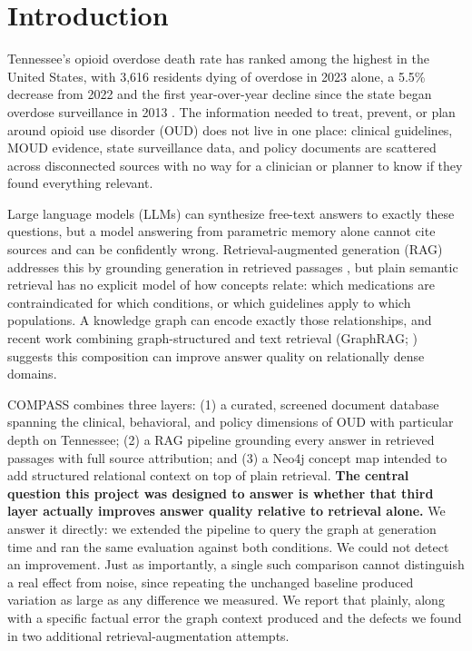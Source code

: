 \documentclass[letterpaper]{article}
\begin{document}
\section{Introduction}

Tennessee's opioid overdose death rate has ranked among the highest in the United States, with 3{,}616 residents dying of overdose in 2023 alone, a 5.5\% decrease from 2022 and the first year-over-year decline since the state began overdose surveillance in 2013 \citep{tdh2025}. The information needed to treat, prevent, or plan around opioid use disorder (OUD) does not live in one place: clinical guidelines, MOUD evidence, state surveillance data, and policy documents are scattered across disconnected sources with no way for a clinician or planner to know if they found everything relevant.

Large language models (LLMs) can synthesize free-text answers to exactly these questions, but a model answering from parametric memory alone cannot cite sources and can be confidently wrong. Retrieval-augmented generation (RAG) addresses this by grounding generation in retrieved passages \citep{lewis2020rag}, but plain semantic retrieval has no explicit model of how concepts relate: which medications are contraindicated for which conditions, or which guidelines apply to which populations. A knowledge graph can encode exactly those relationships, and recent work combining graph-structured and text retrieval (GraphRAG; \citealp{edge2024graphrag}) suggests this composition can improve answer quality on relationally dense domains.

COMPASS combines three layers: (1) a curated, screened document database spanning the clinical, behavioral, and policy dimensions of OUD with particular depth on Tennessee; (2) a RAG pipeline grounding every answer in retrieved passages with full source attribution; and (3) a Neo4j concept map intended to add structured relational context on top of plain retrieval. \textbf{The central question this project was designed to answer is whether that third layer actually improves answer quality relative to retrieval alone.} We answer it directly: we extended the pipeline to query the graph at generation time and ran the same evaluation against both conditions. We could not detect an improvement. Just as importantly, a single such comparison cannot distinguish a real effect from noise, since repeating the unchanged baseline produced variation as large as any difference we measured. We report that plainly, along with a specific factual error the graph context produced and the defects we found in two additional retrieval-augmentation attempts.
\end{document}
